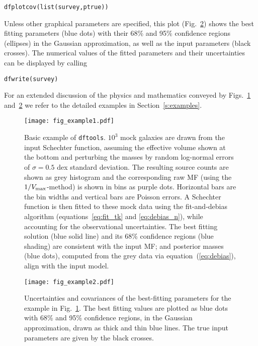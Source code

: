 \documentclass[a4paper,fleqn,usenatbib]{mnras}
\newcommand{\dftools}{\texttt{dftools}\xspace}
\newcommand{\vmax}{V_{\rm max}}
\newcommand{\fig}[1]{Fig.~\ref{fig:#1}}
\newcommand{\eq}[1]{equation~(\ref{eq:#1})}
\newcommand{\s}[1]{Section~\ref{s:#1}}
\begin{document}
%
{\color{blue}\begin{lstlisting}
dfplotcov(list(survey,ptrue))
\end{lstlisting}}
%
\noindent Unless other graphical parameters are specified, this plot (\fig{example_covariance}) shows the best fitting parameters (blue dots) with their 68\% and 95\% confidence regions (ellipses) in the Gaussian approximation, as well as the input parameters (black crosses). The numerical values of the fitted parameters and their uncertainties can be displayed by calling
%
{\color{blue}\begin{lstlisting}
dfwrite(survey)
\end{lstlisting}}
%
\noindent For an extended discussion of the physics and mathematics conveyed by Figs.~\ref{fig:example} and~\ref{fig:example_covariance} we refer to the detailed examples in \s{examples}.

\begin{figure}
\begin{center}
\texttt{[image: fig\_example1.pdf]}\vspace{-3mm}
\caption{Basic example of \dftools. $10^3$ mock galaxies are drawn from the input Schechter function, assuming the effective volume shown at the bottom and perturbing the masses by random log-normal errors of $\sigma=0.5$ dex standard deviation. The resulting source counts are shown as grey histogram and the corresponding raw MF (using the $1/\vmax$-method) is shown in bins as purple dots. Horizontal bars are the bin widths and vertical bars are Poisson errors. A Schechter function is then fitted to these mock data using the fit-and-debias algorithm (equations~\ref{eq:fit_tk} and \ref{eq:debias_n}), while accounting for the observational uncertainties. The best fitting solution (blue solid line) and its 68\% confidence regions (blue shading) are consistent with the input MF; and posterior masses (blue dots), computed from the grey data via \eq{debias}, align with the input model.}\label{fig:example}
\end{center}
\end{figure}

\begin{figure}
\begin{center}
\texttt{[image: fig\_example2.pdf]}\vspace{-3mm}
\caption{Uncertainties and covariances of the best-fitting parameters for the example in \fig{example}. The best fitting values are plotted as blue dots with 68\% and 95\% confidence regions, in the Gaussian approximation, drawn as thick and thin blue lines. The true input parameters are given by the black crosses.}\label{fig:example_covariance}
\end{center}
\end{figure}
\end{document}
